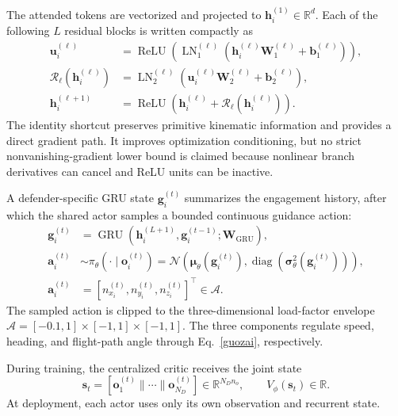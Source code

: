 The attended tokens are vectorized and projected to $\mathbf h_i^{(1)}\in\mathbb R^d$.
Each of the following $L$ residual blocks is written compactly as
\begin{equation}
\label{eq:residual_block}
\begin{aligned}
\mathbf u_i^{(\ell)}&=\operatorname{ReLU}\!\left(
\operatorname{LN}_1^{(\ell)}
(\mathbf h_i^{(\ell)}\mathbf W_1^{(\ell)}+\mathbf b_1^{(\ell)})\right),\\
\mathcal R_{\ell}(\mathbf h_i^{(\ell)})&=
\operatorname{LN}_2^{(\ell)}\!\left(
\mathbf u_i^{(\ell)}\mathbf W_2^{(\ell)}+\mathbf b_2^{(\ell)}\right),\\
\mathbf h_i^{(\ell+1)}&=\operatorname{ReLU}
\left(\mathbf h_i^{(\ell)}+
\mathcal R_{\ell}(\mathbf h_i^{(\ell)})\right).
\end{aligned}
\end{equation}
The identity shortcut preserves primitive kinematic information and provides a direct gradient
path. It improves optimization conditioning, but no strict nonvanishing-gradient lower bound is
claimed because nonlinear branch derivatives can cancel and ReLU units can be inactive.

A defender-specific GRU state $\mathbf g_i^{(t)}$ summarizes the engagement history, after
which the shared actor samples a bounded continuous guidance action:
\begin{equation}
\label{eq:actor_policy}
\begin{aligned}
\mathbf g_i^{(t)}&=\operatorname{GRU}
(\mathbf h_i^{(L+1)},\mathbf g_i^{(t-1)};\mathbf W_{\mathrm{GRU}}),\\
\mathbf a_i^{(t)}&\sim\pi_{\theta}(\cdot\mid\mathbf o_i^{(t)})
=\mathcal N\!\left(\boldsymbol\mu_{\theta}(\mathbf g_i^{(t)}),
\operatorname{diag}(\boldsymbol\sigma_{\theta}^{2}(\mathbf g_i^{(t)}))\right),\\
\mathbf a_i^{(t)}&=[n_{x_i}^{(t)},n_{y_i}^{(t)},n_{z_i}^{(t)}]^{\top}
\in\mathcal A.
\end{aligned}
\end{equation}
The sampled action is clipped to the three-dimensional load-factor envelope
$\mathcal A=[-0.1,1]\times[-1,1]\times[-1,1]$. The three components regulate speed,
heading, and flight-path angle through Eq.~\eqref{guozai}, respectively.

During training, the centralized critic receives the joint state
\begin{equation}
\label{eq:critic_state}
\mathbf s_t=[\mathbf o_1^{(t)}\|\cdots\|\mathbf o_{N_D}^{(t)}]
\in\mathbb R^{N_Dn_o},\qquad V_{\phi}(\mathbf s_t)\in\mathbb R.
\end{equation}
At deployment, each actor uses only its own observation and recurrent state.

